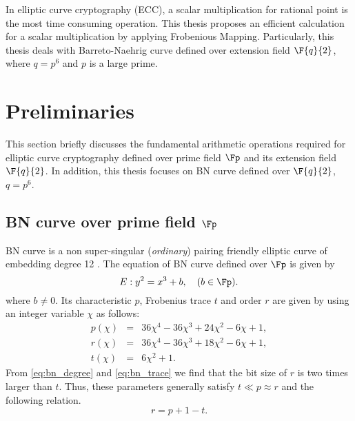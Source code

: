 
In elliptic curve cryptography (ECC), a scalar multiplication for rational point is the most time consuming operation. This thesis proposes an efficient calculation for a scalar multiplication by applying Frobenious Mapping. Particularly, this thesis deals with  Barreto-Naehrig curve defined over extension field $\F{q}{2}$, where $q=p^6$ and $p$ is a large prime.



\section{Preliminaries}
This section briefly discusses the fundamental arithmetic operations required for elliptic curve cryptography defined over prime field $\Fp$ and its extension field $\F{q}{2}$. In addition, this thesis focuses on BN curve defined over $\F{q}{2}$, $q=p^6$.

\subsection{BN curve over prime field $\Fp$}
BN curve is a non\- super-singular (\textit{ordinary}) pairing friendly 
elliptic curve of embedding degree 12 \cite{EPRINT:FreScoTes06}. The equation of BN curve defined over $\Fp$ is given by 
\begin{equation}\label{eq:(BN_curve)}
E:y^2=x^3+b, \quad \mbox{($b \in \Fp$)}.
\end{equation}
where $b \neq 0$. Its characteristic $p$, Frobenius trace $t$ and order $r$ are given by using an integer variable $\chi$ as follows:
\begin{eqnarray}
p(\chi) & = & 36\chi^4-36\chi^3+24\chi^2-6\chi+1, \\
r(\chi) & = & 36\chi^4-36\chi^3+18\chi^2-6\chi+1,\label{eq:bn_degree}  \\
t(\chi) & = & 6\chi^2+1.\label{eq:bn_trace} 
\end{eqnarray} 
From \eqref{eq:bn_degree} and \eqref{eq:bn_trace} we find that the bit size of $r$ is two times larger than $t$. Thus, these parameters generally satisfy $t \ll p \approx r$ and the following relation.
\begin{equation}\label{eq:rpt_relation}
r = p+1-t.
\end{equation}

